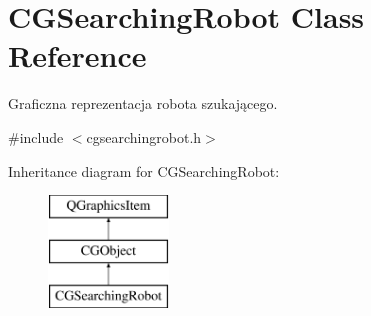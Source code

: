 \hypertarget{class_c_g_searching_robot}{}\section{C\+G\+Searching\+Robot Class Reference}
\label{class_c_g_searching_robot}


Graficzna reprezentacja robota szukającego.  




{\ttfamily \#include $<$cgsearchingrobot.\+h$>$}

Inheritance diagram for C\+G\+Searching\+Robot\+:\begin{figure}[H]
\begin{center}
\leavevmode
\includegraphics[height=3.000000cm]{class_c_g_searching_robot}
\end{center}
\end{figure}
